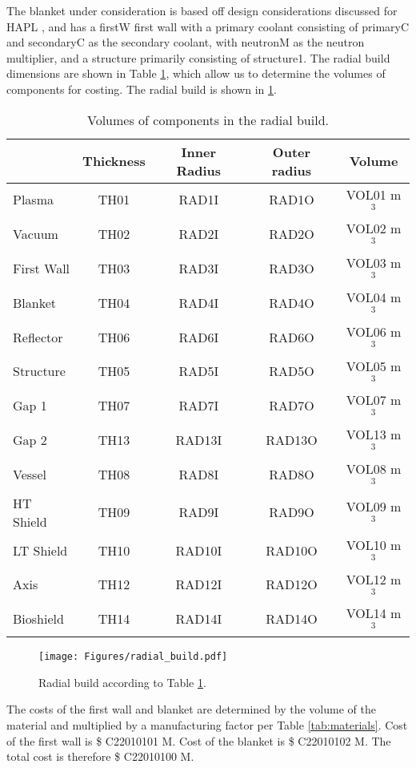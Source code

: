 The blanket under consideration is based off design considerations discussed for HAPL \cite{Raffray2006}, and has a firstW first wall with a primary coolant consisting of primaryC and secondaryC as the secondary coolant, with neutronM as the neutron multiplier, and a structure primarily consisting of structure1. The radial build dimensions are shown in Table \ref{tab:volumes}, which allow us to determine the volumes of components for costing.  The radial build is shown in \ref{fig:radial}.  \\


\begin{table}[h!]
    \centering
    \begin{tabular}{l c  c c c}
    \hline
        &	Thickness	&	Inner Radius	&	Outer radius	&	Volume		\\
        \hline
        Plasma	&	TH01	&	RAD1I	&	RAD1O	&	VOL01	m$^{3}$	\\
        Vacuum	&	TH02	&	RAD2I	&	RAD2O	&	VOL02	m$^{3}$	\\
        First Wall	&	TH03	&	RAD3I	&	RAD3O	&	VOL03	m$^{3}$	\\
        Blanket	&	TH04	&	RAD4I	&	RAD4O	&	VOL04	m$^{3}$	\\
        Reflector	&	TH06	&	RAD6I	&	RAD6O	&	VOL06	m$^{3}$	\\
        Structure	&	TH05	&	RAD5I	&	RAD5O	&	VOL05	m$^{3}$	\\
        Gap	1 &	TH07	&	RAD7I	&	RAD7O	&	VOL07	m$^{3}$	\\
        Gap 2	&	TH13	&	RAD13I	&	RAD13O	&	VOL13	m$^{3}$	\\
        Vessel	&	TH08	&	RAD8I	&	RAD8O	&	VOL08	m$^{3}$	\\
        HT Shield	&	TH09	&	RAD9I	&	RAD9O	&	VOL09	m$^{3}$	\\
        LT Shield	&	TH10	&	RAD10I	&	RAD10O	&	VOL10	m$^{3}$	\\
        Axis	&	TH12	&	RAD12I	&	RAD12O	&	VOL12	m$^{3}$	\\
        Bioshield	&	TH14	&	RAD14I	&	RAD14O	&	VOL14	m$^{3}$	\\
        \hline
    \end{tabular}
    \caption{Volumes of components in the radial build.}
    \label{tab:volumes}
\end{table}

\begin{figure}
    \centering
    \texttt{[image: Figures/radial\_build.pdf]}
    \caption{Radial build according to Table \ref{tab:volumes}.}
    \label{fig:radial}
\end{figure}



The costs of the first wall and blanket are determined by the volume of the material and multiplied by a manufacturing factor per Table \ref{tab:materials}.   Cost of the first wall is \$ C22010101 M.  Cost of the blanket is \$ C22010102 M. The total cost is therefore \$ C22010100 M.


